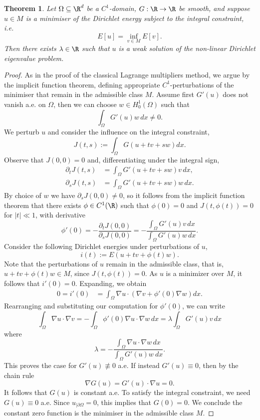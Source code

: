 \documentclass[reqno]{amsart}
\newtheorem{theorem}{Theorem}
\theoremstyle{definition}
\theoremstyle{remark}
\begin{document}
\begin{theorem}
	Let $\Omega \subseteq \R^d$ be a $C^1$-domain, $G : \R \to \R$ be smooth, and suppose $u \in M$ is a minimiser of the Dirichlet energy subject to the integral constraint, i.e.
		\[ E[u] = \inf_{v \in M} E[v]. \] 
	Then there exists $\lambda \in \R$ such that $u$ is a weak solution of the non-linear Dirichlet eigenvalue problem. 
\end{theorem}	

\begin{proof}
	As in the proof of the classical Lagrange multipliers method, we argue by the implicit function theorem, defining appropriate $C^1$-perturbations of the minimiser that remain in the admissible class $M$. Assume first $G' (u)$ does not vanish a.e. on $\Omega$, then we can choose $w \in H_0^1 (\Omega)$ such that 
		\[ \int_\Omega G'(u) w \, dx \neq 0. \]
	We perturb $u$ and consider the influence on the integral constraint, 
		\[ J(t, s) := \int_\Omega G(u + t v + s w) dx. \]
	Observe that $J(0,0) = 0$ and, differentiating under the integral sign, 
		\begin{align*}
			\partial_t J(t, s) 
				&= \int_\Omega G'(u + t v + sw) v \, dx, \\
			\partial_s J(t, s)
				&= \int_\Omega G'(u + t v + s w) w \, dx.
		\end{align*}	
	By choice of $w$ we have $\partial_s J (0, 0) \neq 0$, so it follows from the implicit function theorem that there exists $\phi \in C^1 (\R)$ such that $\phi(0) = 0$ and $J(t, \phi(t)) = 0$ for $|t| \ll 1$, with derivative
		\[ \phi'(0) = -\frac{\partial_t J(0, 0)}{\partial_s J(0, 0)} = - \frac{\int_\Omega G'(u) v \, dx}{\int_\Omega G' (u) w\,  dx}. \]
	Consider the following Dirichlet energies under perturbations of $u$, 
		\[ i(t) := E(u + t v + \phi(t) w). \]	
	Note that the perturbations of $u$ remain in the admissible class, that is, $u + tv + \phi(t)w \in M$, since $J(t, \phi(t)) = 0$. As $u$ is a minimizer over $M$, it follows that $i'(0) = 0$. Expanding, we obtain 
		\begin{align*}
			0 = i'(0) 
				&= \int_\Omega \nabla u \cdot (\nabla v + \phi'(0) \nabla w) dx.
		\end{align*}		
	Rearranging and substituting our computation for $\phi' (0)$, we can write
		\[ \int_\Omega \nabla u \cdot \nabla v = - \int_\Omega \phi'(0) \nabla u \cdot \nabla w\, dx = \lambda \int_\Omega G'(u) v \, dx  \]
	where
		\[ \lambda = - \frac{\int_\Omega \nabla u \cdot \nabla w\, dx}{\int_\Omega G' (u) w\ dx}. \]						This proves the case for $G'(u) \not\equiv 0$ a.e. If instead $G'(u) \equiv 0$, then by the chain rule
		\[ \nabla G(u) = G'(u) \cdot \nabla u = 0. \]
	It follows that $G(u)$ is constant a.e. To satisfy the integral constraint, we need $G(u) \equiv 0$ a.e. Since $u_{|\partial \Omega} = 0$, this implies that $G(0) = 0$. We conclude the constant zero function is the minimiser in the admissible class $M$. 
\end{proof}
\end{document}

